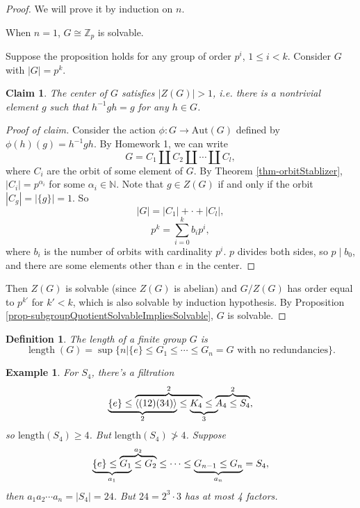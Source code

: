 \documentclass[11pt]{book}
\newtheorem{definition}[theorem]{Definition}
\newtheorem{example}[theorem]{Example}
\newtheorem*{claim}{Claim}
\begin{document}
\begin{proof}
    We will prove it by induction on $n$. 
    
    When $n=1$, $G\cong \mathbb{Z}_{p}$ is solvable. 

    Suppose the proposition holds for any group of order $p^{i}$, $1\leq i<k$. Consider $G$ with $\left| G \right| =p^{k}$. 

    \begin{claim}
        The center of $G$ satisfies $\left| Z(G) \right| >1$, i.e. there is a nontrivial element $g$ such that $h^{-1}gh=g$ for any $h\in G$. 
    \end{claim}
    
    \begin{proof}[Proof of claim]
        Consider the action $\phi:G\to \mathrm{Aut}(G)$ defined by $\phi(h)(g)=h^{-1}gh$. By Homework 1, we can write 
        \[
        G=C_{1}\coprod C_{2}\coprod \cdots \coprod C_{l},
        \]
        where $C_{i}$ are the orbit of some element of $G$. 
        By Theorem \ref{thm-orbitStablizer}, $\left| C_{i} \right| =p^{\alpha_{i}}$ for some $\alpha_{i}\in \mathbb{N}$. Note that $g\in Z(G)$ if and only if the orbit $\left| C_{g} \right| =\left| \{g\} \right| =1$. So 
        \[
        \left| G \right| = \left| C_{1} \right| +\cdot + \left| C_{l} \right|, 
        \]
        \[p^{k}=\sum_{i=0}^{k}b_{i}p^{i},\]
        where $b_{i}$ is the number of orbits with cardinality $p^{i}$. $p$ divides both sides, so $p\mid b_{0}$, and there are some elements other than $e$ in the center. 
    \end{proof}
    Then $Z(G)$ is solvable (since $Z(G)$ is abelian) and $G /Z(G)$ has order equal to $p^{k'}$ for $k' < k$, which is also solvable by induction hypothesis. By Proposition \ref{prop-subgroupQuotientSolvableImpliesSolvable}, $G$ is solvable. 
\end{proof}

\begin{definition}
    The length of a finite group $G$ is 
    \[
    \mathop{\mathrm{length}}(G)=\sup\{n|\{e\}\leq G_{1}\leq \cdots \leq G_{n}=G \text{ with no redundancies}\}. 
    \]
\end{definition}

\begin{example}
    For $S_{4}$, there's a filtration 
    \[
        \lefteqn{\underbrace{\phantom{\{e\}\leq \langle (12)(34)\rangle}}_{2}}\{e\}\leq \overbrace{\langle (12)(34)\rangle \leq \lefteqn{\underbrace{\phantom{K_{4 \leq A_{4}}}}_{3}}K_{4}}^{2}\leq \overbrace{A_{4}\leq S_{4}}^{2},
    \]
    so $\mathrm{length}(S_{4})\geq 4$. But $\mathrm{length}(S_{4})\not>4$. Suppose 
    \[
    \lefteqn{\underbrace{\phantom{\{e\}\leq G_{1}}}_{a_{1}}}\{e\}\leq \overbrace{G_{1}\leq G_{2}}^{a_{2}}\leq \cdots\leq \underbrace{G_{n-1}\leq G_{n}}_{a_{n}}=S_{4}, 
    \]
    then $a_{1}a_{2}\cdots a_{n}=\left| S_{4} \right| =24$. But $24=2^{3}\cdot 3$ has at most 4 factors. 
\end{example}
\end{document}
